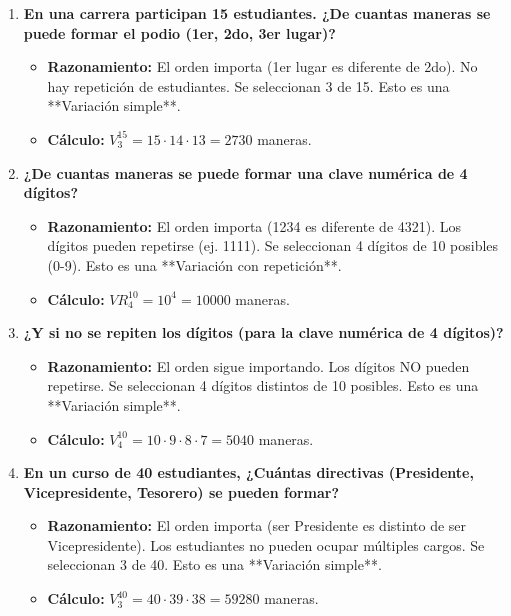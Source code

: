 \documentclass[12pt, letterpaper]{article}
\begin{document}
\begin{enumerate}[leftmargin=*,label=\arabic*.]
    \item \textbf{En una carrera participan 15 estudiantes. ¿De cuantas maneras se puede formar el podio (1er, 2do, 3er lugar)?}
    \begin{itemize}
        \item \textbf{Razonamiento:} El orden importa (1er lugar es diferente de 2do). No hay repetición de estudiantes. Se seleccionan 3 de 15. Esto es una **Variación simple**.
        \item \textbf{Cálculo:} $V_3^{15} = 15 \cdot 14 \cdot 13 = 2730$ maneras.
    \end{itemize}

    \item \textbf{¿De cuantas maneras se puede formar una clave numérica de 4 dígitos?}
    \begin{itemize}
        \item \textbf{Razonamiento:} El orden importa (1234 es diferente de 4321). Los dígitos pueden repetirse (ej. 1111). Se seleccionan 4 dígitos de 10 posibles (0-9). Esto es una **Variación con repetición**.
        \item \textbf{Cálculo:} $VR_4^{10} = 10^4 = 10000$ maneras.
    \end{itemize}

    \item \textbf{¿Y si no se repiten los dígitos (para la clave numérica de 4 dígitos)?}
    \begin{itemize}
        \item \textbf{Razonamiento:} El orden sigue importando. Los dígitos NO pueden repetirse. Se seleccionan 4 dígitos distintos de 10 posibles. Esto es una **Variación simple**.
        \item \textbf{Cálculo:} $V_4^{10} = 10 \cdot 9 \cdot 8 \cdot 7 = 5040$ maneras.
    \end{itemize}

    \item \textbf{En un curso de 40 estudiantes, ¿Cuántas directivas (Presidente, Vicepresidente, Tesorero) se pueden formar?}
    \begin{itemize}
        \item \textbf{Razonamiento:} El orden importa (ser Presidente es distinto de ser Vicepresidente). Los estudiantes no pueden ocupar múltiples cargos. Se seleccionan 3 de 40. Esto es una **Variación simple**.
        \item \textbf{Cálculo:} $V_3^{40} = 40 \cdot 39 \cdot 38 = 59280$ maneras.
    \end{itemize}


\end{enumerate}
\end{document}
